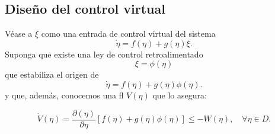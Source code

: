 \subsection{Diseño del control virtual}
Véase a $\xi$ como una entrada de control virtual del sistema
\begin{equation}
	\dot{\eta} = f(\eta) + g(\eta)\xi.
	\label{eq: backstepping_esclavo}
\end{equation}
Suponga que existe una ley de control retroalimentado
\begin{equation*}
	\xi = \phi(\eta)
\end{equation*}
que estabiliza el origen de
\begin{equation*}
	\dot{\eta} = f(\eta) + g(\eta)\phi(\eta).
\end{equation*}
y que, además, conocemos una \gls{fl} $V(\eta)$ que lo asegura:

\begin{equation*}
	\dot{V}(\eta) = \dfrac{\partial(\eta)}{\partial \eta} [f(\eta) + g(\eta)\phi(\eta)] \leq -W(\eta), \quad \forall \eta \in D.
\end{equation*}

